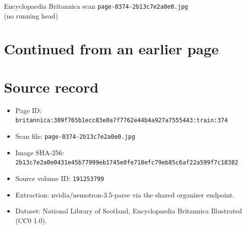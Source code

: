 \documentclass{article}
\begin{document}
\begin{center}
{\Large Encyclopaedia Britannica scan \texttt{page-0374-2b13c7e2a0e0.jpg}}\\[0.5em]
(no running head)
\end{center}
\section*{Continued from an earlier page}
\section*{Source record}
\begin{itemize}
\item Page ID: \texttt{britannica:309f765b1ecc83e0a7f7762e44b4a927a7555443:train:374}
\item Scan file: \texttt{page-0374-2b13c7e2a0e0.jpg}
\item Image SHA-256: \texttt{2b13c7e2a0e0431e45b77999eb1745e0fe718efc79eb85c6af22a599f7c18382}
\item Source volume ID: \texttt{191253799}
\item Extraction: nvidia/nemotron-3.5-parse via the shared organizer endpoint.
\item Dataset: National Library of Scotland, Encyclopaedia Britannica Illustrated (CC0 1.0).
\end{itemize}
\end{document}
